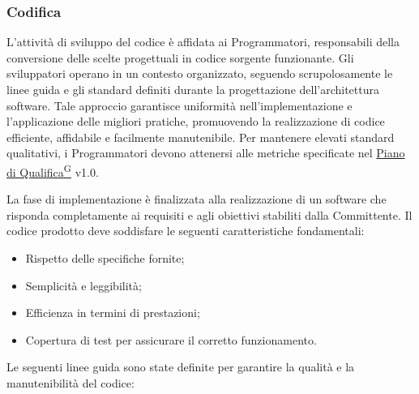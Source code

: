 \subsubsection{Codifica}
L'attività di sviluppo del codice è affidata ai Programmatori, responsabili della conversione delle scelte progettuali in codice sorgente funzionante. Gli sviluppatori operano in un contesto organizzato, seguendo scrupolosamente le linee guida e gli standard definiti durante la progettazione dell'architettura software. Tale approccio garantisce uniformità nell'implementazione e l'applicazione delle migliori pratiche, promuovendo la realizzazione di codice efficiente, affidabile e facilmente manutenibile. 
Per mantenere elevati standard qualitativi, i Programmatori devono attenersi alle metriche specificate nel \href{https://code7crusaders.github.io/docs/RTB/documentazione_interna/glossario.html#piano-di-qualifica}{Piano di Qualifica\textsuperscript{G}} v1.0.

La fase di implementazione è finalizzata alla realizzazione di un software che risponda completamente ai requisiti e agli obiettivi stabiliti dalla Committente. Il codice prodotto deve soddisfare le seguenti caratteristiche fondamentali:
\begin{itemize}
    \item Rispetto delle specifiche fornite;
    \item Semplicità e leggibilità;
    \item Efficienza in termini di prestazioni;
    \item Copertura di test per assicurare il corretto funzionamento.
\end{itemize}

Le seguenti linee guida sono state definite per garantire la qualità e la manutenibilità del codice:

